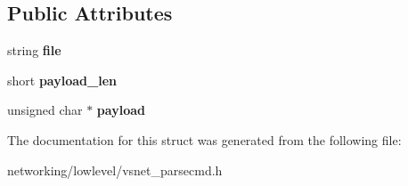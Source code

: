 \subsection*{Public Attributes}
\begin{DoxyCompactItemize}
\item 
string {\bfseries file}\hypertarget{structVsnetDownload_1_1Adapter_1_1Download_ada666e2bcf496e9383addde0355def6a}{}\label{structVsnetDownload_1_1Adapter_1_1Download_ada666e2bcf496e9383addde0355def6a}

\item 
short {\bfseries payload\+\_\+len}\hypertarget{structVsnetDownload_1_1Adapter_1_1Download_a121de82ec54b4357b00a1ac32db9209b}{}\label{structVsnetDownload_1_1Adapter_1_1Download_a121de82ec54b4357b00a1ac32db9209b}

\item 
unsigned char $\ast$ {\bfseries payload}\hypertarget{structVsnetDownload_1_1Adapter_1_1Download_a2fb7b0735eb0353393eacf867523fc2f}{}\label{structVsnetDownload_1_1Adapter_1_1Download_a2fb7b0735eb0353393eacf867523fc2f}

\end{DoxyCompactItemize}


The documentation for this struct was generated from the following file\+:\begin{DoxyCompactItemize}
\item 
networking/lowlevel/vsnet\+\_\+parsecmd.\+h\end{DoxyCompactItemize}
